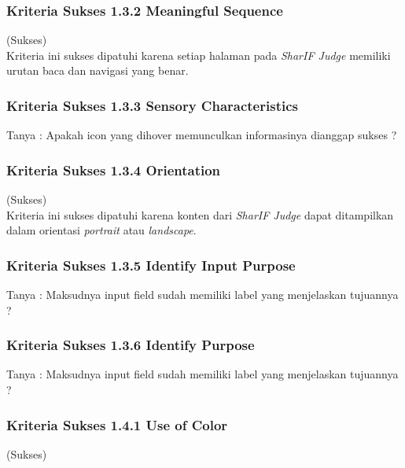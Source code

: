 \subsubsection{Kriteria Sukses 1.3.2 Meaningful Sequence}
\label{subsubsec:kepatuhan_kriteria_1.3.2}
(Sukses) \\

Kriteria ini sukses dipatuhi karena setiap halaman pada \textit{SharIF Judge} memiliki urutan baca dan navigasi yang benar.

\subsubsection{Kriteria Sukses 1.3.3 Sensory Characteristics}
\label{subsubsec:kepatuhan_kriteria_1.3.3}

Tanya : Apakah icon yang dihover memunculkan informasinya dianggap sukses ?

\subsubsection{Kriteria Sukses 1.3.4 Orientation}
\label{subsubsec:kepatuhan_kriteria_1.3.4}
(Sukses) \\

Kriteria ini sukses dipatuhi karena konten dari \textit{SharIF Judge} dapat ditampilkan dalam orientasi \textit{portrait} atau \textit{landscape}.

\subsubsection{Kriteria Sukses 1.3.5 Identify Input Purpose}
\label{subsubsec:kepatuhan_kriteria_1.3.5}

Tanya : Maksudnya input field sudah memiliki label yang menjelaskan tujuannya ?

\subsubsection{Kriteria Sukses 1.3.6 Identify Purpose}
\label{subsubsec:kepatuhan_kriteria_1.3.6}

Tanya : Maksudnya input field sudah memiliki label yang menjelaskan tujuannya ?

\subsubsection{Kriteria Sukses 1.4.1 Use of Color}
\label{subsubsec:kepatuhan_kriteria_1.4.1}
(Sukses) \\

